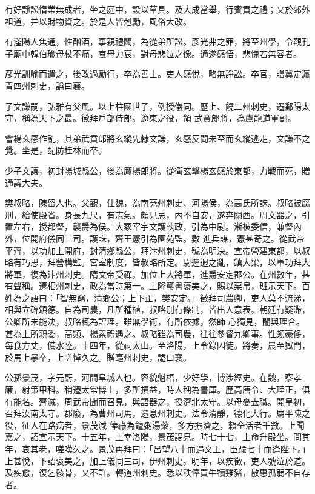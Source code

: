 \begin{pinyinscope}
 有好諍訟惰業無成者，坐之庭中，設以草具。及大成當舉，行賓貢之禮；又於郊外祖道，并以財物資之。於是人皆剋勵，風俗大改。



 有滏陽人焦通，性酗酒，事親禮闕，為從弟所訟。彥光弗之罪，將至州學，令觀孔子廟中韓伯瑜母杖不痛，哀母力衰，對母悲泣之像。通遂感悟，悲愧若無容者。



 彥光訓喻而遣之，後改過勵行，卒為善士。吏人感悅，略無諍訟。卒官，贈冀定瀛青四州刺史，謚曰襄。



 子文謙嗣，弘雅有父風。以上柱國世子，例授儀同。歷上、饒二州刺史，遷鄱陽太守，稱為天下之最。徵拜戶部侍郎。遼東之役，領
 武賁郎將，為盧龍道軍副。



 會楊玄感作亂，其弟武賁郎將玄縱先隸文謙，玄感反問未至而玄縱逃走，文謙不之覺。坐是，配防桂林而卒。



 少子文讓，初封陽城縣公，後為鷹揚郎將。從衛玄擊楊玄感於東都，力戰而死，贈通議大夫。



 樊叔略，陳留人也。父觀，仕魏，為南兗州刺史、河陽侯，為高氏所誅。叔略被腐刑，給使殿省。身長九尺，有志氣。頗見忌，內不自安，遂奔關西。周文器之，引置左右，授都督，襲爵為侯。大冢宰宇文護執政，引為中尉。漸被委信，兼督內外，位開府儀同三司。護誅，齊王憲引為園苑監。數
 進兵謀，憲甚奇之。從武帝平齊，以功加上開府，封清鄉縣公，拜汴州刺史，號為明決。宣帝營建東都，以叔略有巧思，拜營構監。宮室制度，皆叔略所定。尉遲迥之亂，鎮大梁，以軍功拜大將軍，復為汴州刺史。隋文帝受禪，加位上大將軍，進爵安定郡公。在州數年，甚有聲稱。遷相州刺史，政為當時第一。上降璽書褒美之，賜以粟帛，班示天下。百姓為之語曰：「智無窮，清鄉公；上下正，樊安定。」徵拜司農卿，吏人莫不流涕，相與立碑頌德。自為司農，凡所種植，叔略別有條制，皆出人意表。朝廷有疑滯，公卿所未能決，叔略輒為評理。雖無學術，有所依據，然師
 心獨見，闇與理合。甚為上所親委，高熲、楊素禮遇之。叔略雖為司農，往往參督九卿事。性頗豪侈，每食方丈，備水陸。十四年，從祠太山。至洛陽，上令錄囚徒。將奏，晨至獄門，於馬上暴卒，上嗟悼久之。贈亳州刺史，謚曰襄。



 公孫景茂，字元蔚，河間阜城人也。容貌魁梧，少好學，博涉經史。在魏，察孝廉，射策甲科。稍遷太常博士，多所損益，時人稱為書庫。歷高唐令、大理正，俱有能名。齊滅，周武帝聞而召見，與語器之，授濟北太守。以母憂去職。開皇初，召拜汝南太守。郡廢，為曹州司馬，遷息州刺史。法令清靜，德化大行。屬平陳之役，征人在路病者，景茂減
 俸祿為饘粥湯藥，多方振濟之，賴全活者千數。上聞嘉之，詔宣示天下。十五年，上幸洛陽，景茂謁見。時七十七，上命升殿坐。問其年，哀其老，嗟嘆久之。景茂再拜曰：「呂望八十而遇文王，臣踰七十而逢陛下。」上甚悅，下詔褒美之，加上儀同三司，伊州刺史。明年，以疾徵，吏人號泣於道。及疾愈，復乞骸骨，又不許。轉道州刺史。悉以秩俸買牛犢雞豬，散惠孤弱不自存者。




\end{pinyinscope}
